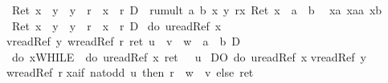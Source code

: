 \begin{isabellebody}
\begin{isamarkuptxt}
      \begin{isabelle}%
{\isasymturnstile}\ Ret\ {\isacharparenleft}x\ {\isasymnoteq}\ y\ {\isasymand}\ y\ {\isasymnoteq}\ r\ {\isasymand}\ x\ {\isasymnoteq}\ r{\isacharparenright}\ {\isasymlongrightarrow}\isactrlsub D\ {\isacharbrackleft}{\isacharhash}\ rumult\ a\ b\ x\ y\ r{\isacharbrackright}{\isacharparenleft}{\isasymlambda}x{\isachardot}\ Ret\ {\isacharparenleft}x\ {\isacharequal}\ a\ {\isacharasterisk}\ b{\isacharparenright}{\isacharparenright}\isanewline
\ {}{\isachardot}\ {\isasymAnd}xa\ xaa\ xb{\isachardot}\isanewline
{}\ Ret\ {\isacharparenleft}x\ {\isasymnoteq}\ y\ {\isasymand}\ y\ {\isasymnoteq}\ r\ {\isasymand}\ x\ {\isasymnoteq}\ r{\isacharparenright}\ {\isasymand}\isactrlsub D\isanewline
{}\ {\isacharparenleft}do\ {\isacharbraceleft}u{\isasymleftarrow}readRef\ x{\isacharsemicolon}\isanewline
{}v{\isasymleftarrow}readRef\ y{\isacharsemicolon}\ w{\isasymleftarrow}readRef\ r{\isacharsemicolon}\ ret\ {\isacharparenleft}u\ {\isacharasterisk}\ v\ {\isacharplus}\ w\ {\isacharequal}\ a\ {\isacharasterisk}\ b{\isacharparenright}{\isacharbraceright}{\isacharparenright}\ {\isasymlongrightarrow}\isactrlsub D\isanewline
{}\ do\ {\isacharbraceleft}x{\isasymleftarrow}WHILE\ {\isasymUp}\ {\isacharparenleft}do\ {\isacharbraceleft}u{\isasymleftarrow}readRef\ x{\isacharsemicolon}\ ret\ {\isacharparenleft}{}\ {\isacharless}\ u{\isacharparenright}{\isacharbraceright}{\isacharparenright}\ \isanewline
{}DO\ do\ {\isacharbraceleft}u{\isasymleftarrow}readRef\ x{\isacharsemicolon}\isanewline
{}v{\isasymleftarrow}readRef\ y{\isacharsemicolon}\isanewline
{}w{\isasymleftarrow}readRef\ r{\isacharsemicolon}\isanewline
{}xa{\isasymleftarrow}if\ nat{\isacharunderscore}odd\ u\ then\ r\ {\isacharcolon}{\isacharequal}\ w\ {\isacharplus}\ v\ else\ ret\ {\isacharparenleft}{\isacharparenright}{\isacharsemicolon}\isanewline

\end{isabelle}
\end{isamarkuptxt}
\end{isabellebody}
